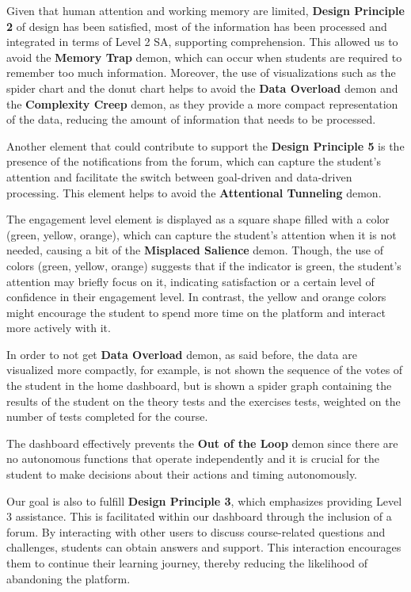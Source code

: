 Given that human attention and working memory are limited, \textbf{Design Principle 2} of design has been satisfied, most of the information has been processed and integrated in terms of Level 2 SA, supporting comprehension.
This allowed us to avoid the \textbf{Memory Trap} demon, which can occur when students are required to remember too much information. 
Moreover, the use of visualizations such as the spider chart and the donut chart helps to avoid the \textbf{Data Overload} demon and the \textbf{Complexity Creep} demon, as they provide a more compact representation of the data, reducing the amount of information that needs to be processed.

Another element that could contribute to support the \textbf{Design Principle 5} is the presence of the notifications from the forum, which can capture the student's attention and facilitate the switch between goal-driven and data-driven processing. This element helps to avoid the \textbf{Attentional Tunneling} demon.

The engagement level element is displayed as a square shape filled with a color (green, yellow, orange), which can capture the student's attention when it is not needed, causing a bit of the \textbf{Misplaced Salience} demon. 
Though, the use of colors (green, yellow, orange) suggests that if the indicator is green, the student's attention may briefly focus on it, indicating satisfaction or a certain level of confidence in their engagement level. In contrast, the yellow and orange colors might encourage the student to spend more time on the platform and interact more actively with it.

In order to not get \textbf{Data Overload} demon, as said before, the data are visualized
more compactly, for example, is not shown the sequence of the votes of the student in
the home dashboard, but is shown a spider graph containing the results of the student on the
theory tests and the exercises tests, weighted on the number of tests completed for the course.

The dashboard effectively prevents the \textbf{Out of the Loop} demon since there are no autonomous functions that operate independently and it is crucial for the student to make decisions about their actions and timing autonomously.

Our goal is also to fulfill \textbf{Design Principle 3}, which emphasizes providing Level 3 assistance. 
This is facilitated within our dashboard through the inclusion of a forum. By interacting with other users to discuss course-related 
questions and challenges, students can obtain answers and support. This interaction encourages them to continue their learning journey, 
thereby reducing the likelihood of abandoning the platform. 

